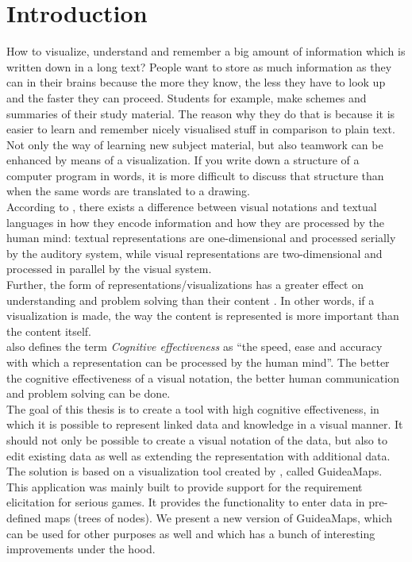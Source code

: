 \chapter{Introduction}\label{ch:introduction}

How to visualize, understand and remember a big amount of information which is written down in a long text? People want to store as much information as they can in their brains because the more they know, the less they have to look up and the faster they can proceed. Students for example, make schemes and summaries of their study material. The reason why they do that is because it is easier to learn and remember nicely visualised stuff in comparison to plain text.
Not only the way of learning new subject material, but also teamwork can be enhanced by means of a visualization. If you write down a structure of a computer program in words, it is more difficult to discuss that structure than when the same words are translated to a drawing.\\

According to \cite{moody-physicsofnotations-2009}, there exists a difference between visual notations and textual languages in how they encode information and how they are processed by the human mind: textual representations are one-dimensional and processed serially by the auditory system, while visual representations are two-dimensional and processed in parallel by the visual system.\\

Further, the form of representations/visualizations has a greater effect on understanding and problem solving than their content \citep{moody-innsbruck-2012}. In other words, if a visualization is made, the way the content is represented is more important than the content itself.\\

\cite{moody-physicsofnotations-2009} also defines the term \textit{Cognitive effectiveness} as ``the speed, ease and accuracy with which a representation can be processed by the human mind''. The better the cognitive effectiveness of a visual notation, the better human communication and problem solving can be done.\\

The goal of this thesis is to create a tool with high cognitive effectiveness, in which it is possible to represent linked data and knowledge in a visual manner. It should not only be possible to create a visual notation of the data, but also to edit existing data as well as extending the representation with additional data. The solution is based on a visualization tool created by \cite{erikjanssens}, called GuideaMaps. This application was mainly built to provide support for the requirement elicitation for serious games. It provides the functionality to enter data in pre-defined maps (trees of nodes). We present a new version of GuideaMaps, which can be used for other purposes as well and which has a bunch of interesting improvements under the hood.

